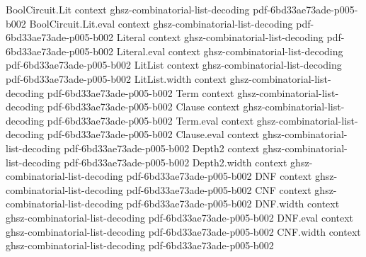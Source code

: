 \begin{lemma}
\label{BooleanAnalysis.boolToSign_false}
\label{BooleanAnalysis.boolToSign_true}
\label{BooleanAnalysis.boolToSign_sq}
\label{BooleanAnalysis.boolToSign_mul_self}
\label{BooleanAnalysis.boolToSign_not}
\leanok
{}
\proofstep
  {BoolCircuit.Lit}
  {context}
  {ghsz-combinatorial-list-decoding}
  {pdf-6bd33ae73ade-p005-b002}
\proofstep
  {BoolCircuit.Lit.eval}
  {context}
  {ghsz-combinatorial-list-decoding}
  {pdf-6bd33ae73ade-p005-b002}
\proofstep
  {Literal}
  {context}
  {ghsz-combinatorial-list-decoding}
  {pdf-6bd33ae73ade-p005-b002}
\proofstep
  {Literal.eval}
  {context}
  {ghsz-combinatorial-list-decoding}
  {pdf-6bd33ae73ade-p005-b002}
\proofstep
  {LitList}
  {context}
  {ghsz-combinatorial-list-decoding}
  {pdf-6bd33ae73ade-p005-b002}
\proofstep
  {LitList.width}
  {context}
  {ghsz-combinatorial-list-decoding}
  {pdf-6bd33ae73ade-p005-b002}
\proofstep
  {Term}
  {context}
  {ghsz-combinatorial-list-decoding}
  {pdf-6bd33ae73ade-p005-b002}
\proofstep
  {Clause}
  {context}
  {ghsz-combinatorial-list-decoding}
  {pdf-6bd33ae73ade-p005-b002}
\proofstep
  {Term.eval}
  {context}
  {ghsz-combinatorial-list-decoding}
  {pdf-6bd33ae73ade-p005-b002}
\proofstep
  {Clause.eval}
  {context}
  {ghsz-combinatorial-list-decoding}
  {pdf-6bd33ae73ade-p005-b002}
\proofstep
  {Depth2}
  {context}
  {ghsz-combinatorial-list-decoding}
  {pdf-6bd33ae73ade-p005-b002}
\proofstep
  {Depth2.width}
  {context}
  {ghsz-combinatorial-list-decoding}
  {pdf-6bd33ae73ade-p005-b002}
\proofstep
  {DNF}
  {context}
  {ghsz-combinatorial-list-decoding}
  {pdf-6bd33ae73ade-p005-b002}
\proofstep
  {CNF}
  {context}
  {ghsz-combinatorial-list-decoding}
  {pdf-6bd33ae73ade-p005-b002}
\proofstep
  {DNF.width}
  {context}
  {ghsz-combinatorial-list-decoding}
  {pdf-6bd33ae73ade-p005-b002}
\proofstep
  {DNF.eval}
  {context}
  {ghsz-combinatorial-list-decoding}
  {pdf-6bd33ae73ade-p005-b002}
\proofstep
  {CNF.width}
  {context}
  {ghsz-combinatorial-list-decoding}
  {pdf-6bd33ae73ade-p005-b002}

\end{lemma}
